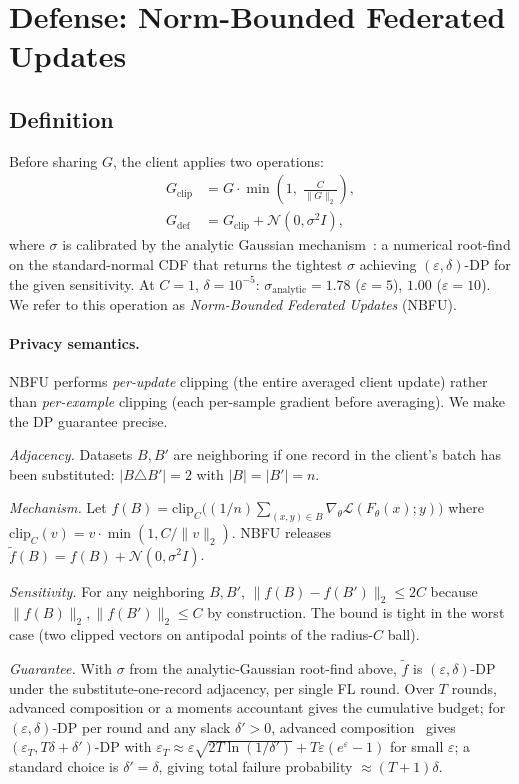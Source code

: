 \documentclass[11pt]{article}
\begin{document}
\section{Defense: Norm-Bounded Federated Updates}
\label{sec:method}

\subsection{Definition}
Before sharing $G$, the client applies two operations:
\begin{align}
G_{\text{clip}} &= G \cdot \min\!\left(1,\; \frac{C}{\|G\|_2}\right), \label{eq:clip}\\
G_{\text{def}} &= G_{\text{clip}} + \mathcal{N}(0, \sigma^2 I), \label{eq:noise}
\end{align}
where $\sigma$ is calibrated by the analytic Gaussian mechanism~\citep{gaussianmechanism2018}: a numerical root-find on the standard-normal CDF that returns the tightest $\sigma$ achieving $(\varepsilon,\delta)$-DP for the given sensitivity. At $C{=}1$, $\delta{=}10^{-5}$: $\sigma_{\text{analytic}}{=}1.78$ ($\varepsilon{=}5$), $1.00$ ($\varepsilon{=}10$). We refer to this operation as \emph{Norm-Bounded Federated Updates} (NBFU).

\paragraph{Privacy semantics.}
NBFU performs \emph{per-update} clipping (the entire averaged client update) rather than \emph{per-example} clipping (each per-sample gradient before averaging). We make the DP guarantee precise.

\emph{Adjacency.} Datasets $B, B'$ are neighboring if one record in the client's batch has been substituted: $|B \triangle B'| = 2$ with $|B| = |B'| = n$.

\emph{Mechanism.} Let $f(B) = \mathrm{clip}_C\!\big((1/n)\sum_{(x,y)\in B} \nabla_\theta \mathcal{L}(F_\theta(x); y)\big)$ where $\mathrm{clip}_C(v) = v \cdot \min(1, C/\|v\|_2)$. NBFU releases $\tilde f(B) = f(B) + \mathcal{N}(0, \sigma^2 I)$.

\emph{Sensitivity.} For any neighboring $B, B'$, $\|f(B) - f(B')\|_2 \le 2C$ because $\|f(B)\|_2, \|f(B')\|_2 \le C$ by construction. The bound is tight in the worst case (two clipped vectors on antipodal points of the radius-$C$ ball).

\emph{Guarantee.} With $\sigma$ from the analytic-Gaussian root-find above, $\tilde f$ is $(\varepsilon, \delta)$-DP under the substitute-one-record adjacency, per single FL round. Over $T$ rounds, advanced composition or a moments accountant gives the cumulative budget; for $(\varepsilon,\delta)$-DP per round and any slack $\delta'>0$, advanced composition~\citep[Theorem 3.20]{differentialprivacy2014} gives $(\varepsilon_T, T\delta + \delta')$-DP with $\varepsilon_T \approx \varepsilon\sqrt{2T\ln(1/\delta')} + T\varepsilon(e^\varepsilon - 1)$ for small $\varepsilon$; a standard choice is $\delta'{=}\delta$, giving total failure probability $\approx (T{+}1)\delta$.
\end{document}
